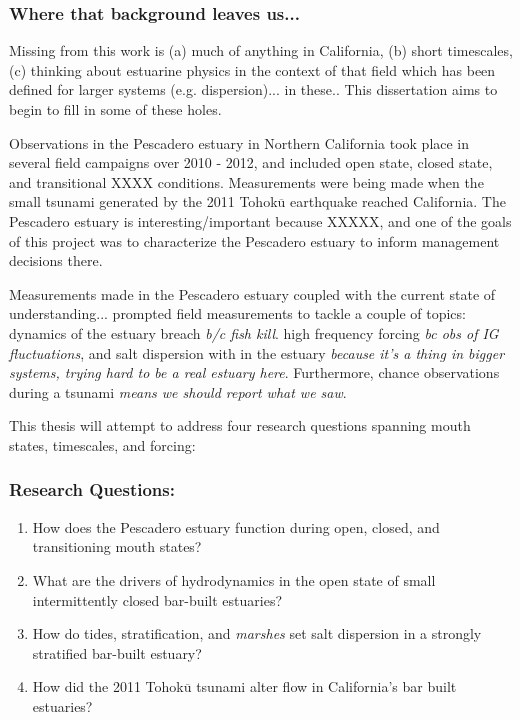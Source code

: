 \subsubsection{Where that background leaves us...}

Missing from this work is (a) much of anything in California, (b) short timescales, (c) thinking about estuarine physics in the context of that field which has been defined for larger systems (e.g. dispersion)... in these.. This dissertation aims to begin to fill in some of these holes. 

Observations in the Pescadero estuary in Northern California took place in several field campaigns over 2010 - 2012, and included open state, closed state, and transitional XXXX conditions. Measurements were being made when the small tsunami generated by the 2011 Tohok$\overline{\mathrm{u}}$ earthquake reached California. The Pescadero estuary is interesting/important because XXXXX, and one of the goals of this project was to characterize the Pescadero estuary to inform management decisions there. 

Measurements made in the Pescadero estuary coupled with the current state of understanding... prompted field measurements to tackle a couple of topics: dynamics of the estuary breach \emph{b/c fish kill}. high frequency forcing \emph{bc obs of IG fluctuations}, and salt dispersion with in the estuary \emph{because it's a thing in bigger systems, trying hard to be a real estuary here}. Furthermore, chance observations during a tsunami \emph{means we should report what we saw}. 

This thesis will attempt to address four research questions spanning mouth states, timescales, and forcing: 


\subsubsection{Research Questions:}
\begin{enumerate}
	\item{How does the Pescadero estuary function during open, closed, and transitioning mouth states?}
	\item{What are the drivers of hydrodynamics in the open state of small intermittently closed bar-built estuaries?}
	\item{How do tides, stratification, and \emph{marshes} set salt dispersion in a strongly stratified bar-built estuary?}
	\item{How did the 2011 Tohok$\overline{\mathrm{u}}$ tsunami alter flow in California's bar built estuaries?}
\end{enumerate}

